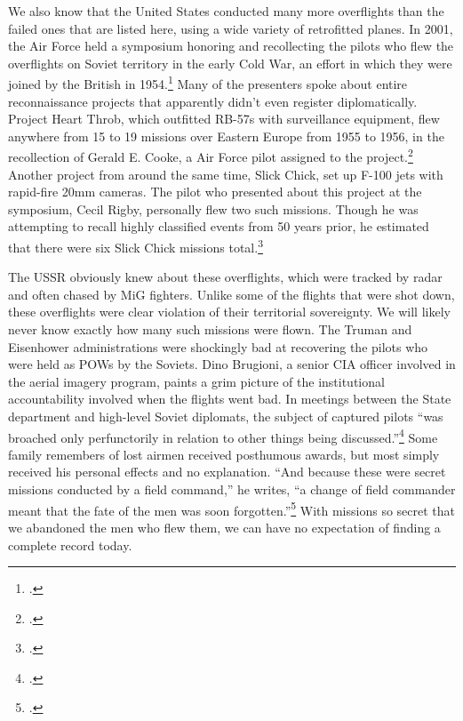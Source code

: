\documentclass{report}
\begin{document}
\begin{refsegment}
We also know that the United States conducted many more overflights than the failed ones that are listed here, using a wide variety of retrofitted planes. In 2001, the Air Force held a symposium honoring and recollecting the pilots who flew the overflights on Soviet territory in the early Cold War, an effort in which they were joined by the British in 1954.\footcite[p.~v]{hall_early_2003} Many of the presenters spoke about entire reconnaissance projects that apparently didn't even register diplomatically. Project Heart Throb, which outfitted RB-57s with surveillance equipment, flew anywhere from 15 to 19 missions over Eastern Europe from 1955 to 1956, in the recollection of Gerald E. Cooke, a Air Force pilot assigned to the project.\footcite[p.~194]{hall_early_2003} Another project from around the same time, Slick Chick, set up F-100 jets with rapid-fire 20mm cameras. The pilot who presented about this project at the symposium, Cecil Rigby, personally flew two such missions. Though he was attempting to recall highly classified events from 50 years prior, he estimated that there were six Slick Chick missions total.\footcite[p.~176]{hall_early_2003}

The USSR obviously knew about these overflights, which were tracked by radar and often chased by MiG fighters. Unlike some of the flights that were shot down, these overflights were clear violation of their territorial sovereignty. We will likely never know exactly how many such missions were flown. The Truman and Eisenhower administrations were shockingly bad at recovering the pilots who were held as POWs by the Soviets. Dino Brugioni, a senior CIA officer involved in the aerial imagery program, paints a grim picture of the institutional accountability involved when the flights went bad. In meetings between the State department and high-level Soviet diplomats, the subject of captured pilots ``was broached only perfunctorily in relation to other things being discussed.''\footcite[p.~72]{brugioni_eyes_2010} Some family remembers of lost airmen received posthumous awards, but most simply received his personal effects and no explanation. ``And because these were secret missions conducted by a field command,'' he writes, ``a change of field commander meant that the fate of the men was soon forgotten.''\footcite[p.~72]{brugioni_eyes_2010} With missions so secret that we abandoned the men who flew them, we can have no expectation of finding a complete record today.


\end{refsegment}
\end{document}
